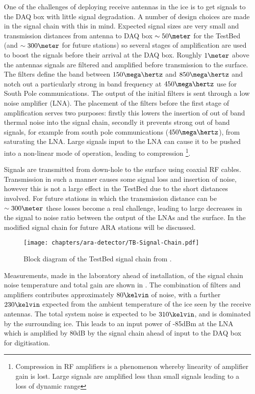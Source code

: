 One of the challenges of deploying receive antennas in the ice is to get signals to the DAQ box with little signal degradation. A number of design choices are made in the signal chain with this in mind. Expected signal sizes are very small and transmission distances from antenna to DAQ box $\sim 50\meter$ for the TestBed (and $\sim 300\meter$ for future stations) so several stages of amplification are used to boost the signals before their arrival at the DAQ box. Roughly $1 \meter$ above the antennas signals are filtered and amplified before transmission to the surface. The filters define the band between $150 \mega\hertz$ and $850 \mega\hertz$ and notch out a particularly strong in band frequency at $450 \mega \hertz$ use for South Pole communications. The output of the initial filters is sent through a low noise amplifier (LNA). The placement of the filters before the first stage of amplification serves two purposes: firstly this lowers the insertion of out of band thermal noise into the signal chain, secondly it prevents strong out of band signals, for example from south pole communications ($450 \mega\hertz$), from saturating the LNA. Large signals input to the LNA can cause it to be pushed into a non-linear mode of operation, leading to compression \footnote{Compression in RF amplifiers is a phenomenon whereby linearity of amplifier gain is lost. Large signals are amplified less than small signals leading to a loss of dynamic range}.

Signals are transmitted from down-hole to the surface using coaxial RF cables. Transmission in such a manner causes some signal loss and insertion of noise, however this is not a large effect in the TestBed due to the short distances involved. For future stations in which the transmission distance can be $\sim 300 \meter$ these losses become a real challenge, leading to large decreases in the signal to noise ratio between the output of the LNAs and the surface. In  the modified signal chain for future ARA stations will be discussed.

\begin{figure}[htpb]
  \centering
  \texttt{[image: chapters/ara-detector/TB-Signal-Chain.pdf]}
  \caption{Block diagram of the TestBed signal chain from \cite{Allison2012457}.}
  \label{fig:ara-detector:TestBed:Signal-Chain}
\end{figure}

Measurements, made in the laboratory ahead of installation, of the signal chain noise temperature and total gain are shown in . The combination of filters and amplifiers contributes approximately $80 \kelvin$ of noise, with a further $230 \kelvin$ expected from the ambient temperature of the ice seen by the receive antennas. The total system noise is expected to be $310 \kelvin$, and is dominated by the surrounding ice. This leads to an input power of -85dBm at the LNA which is amplified by 80dB by the signal chain ahead of input to the DAQ box for digitisation.

